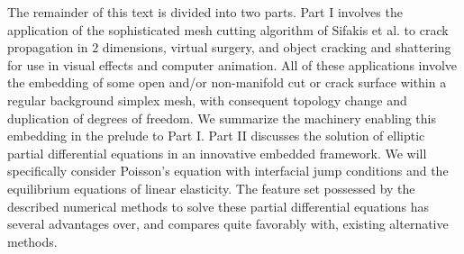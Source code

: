 The remainder of this text is divided into two parts. Part I involves the application of the sophisticated mesh cutting algorithm of Sifakis et al. \cite{Sifakis07} to crack propagation in $2$ dimensions, virtual surgery, and object cracking and shattering for use in visual effects and computer animation. All of these applications involve the embedding of some open and/or non-manifold cut or crack surface within a regular background simplex mesh, with consequent topology change and duplication of degrees of freedom. We summarize the machinery enabling this embedding in the prelude to Part I. Part II discusses the solution of elliptic partial differential equations in an innovative embedded framework. We will specifically consider Poisson's equation with interfacial jump conditions and the equilibrium equations of linear elasticity. The feature set possessed by the described numerical methods to solve these partial differential equations has several advantages over, and compares quite favorably with, existing alternative methods.
